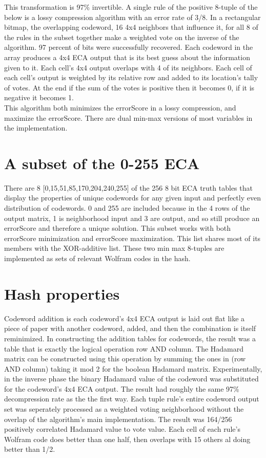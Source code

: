 \documentclass[11pt]{article}
\begin{document}
This transformation is 97\% invertible. A single rule of the positive 8-tuple of the below is a lossy compression algorithm with an error rate of 3/8. In a rectangular bitmap, the overlapping codeword, 16 4x4 neighbors that influence it, for all 8 of the rules in the subset together make a weighted vote on the inverse of the algorithm. 97 percent of bits were successfully recovered. Each codeword in the array produces a 4x4 ECA output that is its best guess about the information given to it. Each cell's 4x4 output overlaps with 4 of its neighbors. Each cell of each cell's output is weighted by its relative row and added to its location's tally of votes. At the end if the sum of the votes is positive then it becomes 0, if it is negative it becomes 1.\\

This algorithm both minimizes the errorScore in a lossy compression, and maximize the errorScore. There are dual min-max versions of most variables in the implementation.\\

\section{A subset of the 0-255 ECA}

There are 8 [0,15,51,85,170,204,240,255] of the 256 8 bit ECA truth tables that display the properties of unique codewords for any given input and perfectly even distribution of codewords. 0 and 255 are included because in the 4 rows of the output matrix, 1 is neighborhood input and 3 are output, and so still produce an errorScore and therefore a unique solution. This subset works with both errorScore minimization and errorScore maximization. This list shares most of its members with the XOR-additive list. \cite{xorAdditive} These two min max 8-tuples are implemented as sets of relevant Wolfram codes in the hash.\\

\section{Hash properties}

Codeword addition is each codeword's 4x4 ECA output is laid out flat like a piece of paper with another codeword, added, and then the combination is itself reminimized. In constructing the addition tables for codewords, the result was a table that is exactly the logical operation row AND column. The Hadamard matrix can be constructed using this operation by summing the ones in (row AND column) taking it mod 2 for the boolean Hadamard matrix. Experimentally, in the inverse phase the binary Hadamard value of the codeword was substituted for the codeword's 4x4 ECA output. The result had roughly the same 97\% decompression rate as the the first way. Each tuple rule's entire codeword output set was seperately processed as a weighted voting neighborhood without the overlap of the algorithm's main implementation. The result was 164/256 positively correlated Hadamard value to vote value. Each cell of each rule's Wolfram code does better than one half, then overlaps with 15 others al doing better than 1/2.\\
\end{document}
